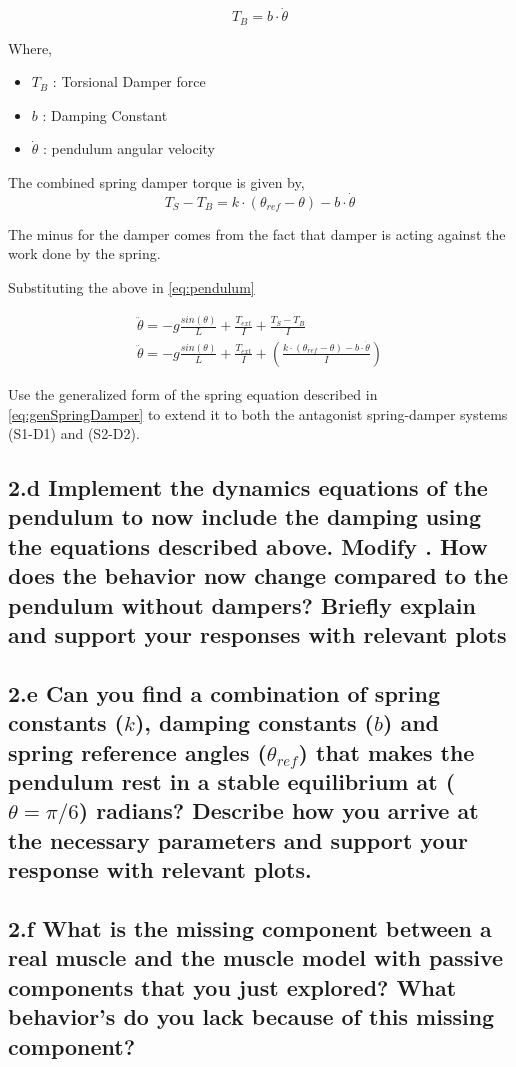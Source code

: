 \documentclass{cmc}
\begin{document}
\begin{equation}
  \label{eqn:damper}
  T_{B} = b \cdot \dot{\theta}
\end{equation}

Where,
\begin{itemize}
\item $T_{B}$ : Torsional Damper force
\item $b$ : Damping Constant
\item $\dot{\theta}$ : pendulum angular velocity
\end{itemize}

The combined spring damper torque is given by,
\begin{equation}
  \label{eq:spring_damper}
  T_{S} - T_{B} = k \cdot (\theta_{ref} - \theta) - b \cdot \dot{\theta}
\end{equation}

The minus for the damper comes from the fact that damper is acting
against the work done by the spring.

Substituting the above in \ref{eq:pendulum}

\begin{eqnarray}
  \label{eq:spring-damper}
  \ddot{\theta} = -g\frac{sin(\theta)}{L} + \frac{T_{ext}}{I} + \frac{T_{S} - T_{B}}{I} \\
  \ddot{\theta} = -g\frac{sin(\theta)}{L}+ \frac{T_{ext}}{I} + (\frac{k \cdot (\theta_{ref} - \theta) - b \cdot \dot{\theta}}{I}) \label{eq:genSpringDamper}
\end{eqnarray}

Use the generalized form of the spring equation described in
\ref{eq:genSpringDamper} to extend it to both the antagonist
spring-damper systems (S1-D1) and (S2-D2).


\subsection*{2.d Implement the dynamics equations of the pendulum to
  now include the damping using the equations described above. Modify
  .  How does the
  behavior now change compared to the pendulum without dampers? Briefly explain and support your
  responses with relevant plots}


\subsection*{2.e Can you find a combination of spring constants ($k$),
  damping constants ($b$) and spring reference angles ($\theta_{ref}$)
  that makes the pendulum rest in a stable equilibrium at
  ($\theta = \pi/6$) radians? Describe how you arrive at the necessary
  parameters and support your response with relevant plots.}


\subsection*{2.f What is the missing component between a real muscle
  and the muscle model with passive components that you just explored?
  What behavior's do you lack because of this missing component?}
\end{document}
